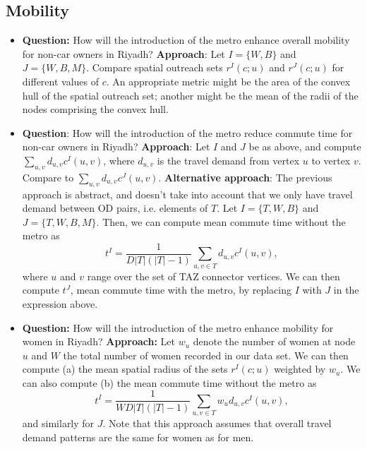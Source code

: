 \documentclass[english]{scrartcl}
\newcommand\abs[1]{\left|#1\right|}
\begin{document}
	\subsection{Mobility}
		\begin{itemize}
			\item \textbf{Question:} How will the introduction of the metro enhance overall mobility for non-car owners in Riyadh? \textbf{Approach}: Let $I = \{W, B\}$ and $J = \{W, B, M\}$. Compare spatial outreach sets $r^{I}(c;u)$ and $r^{J}(c;u)$ for different values of $c$. An appropriate metric might be the area of the convex hull of the spatial outreach set; another might be the mean of the radii of the nodes comprising the convex hull. 
			\item \textbf{Question}: How will the introduction of the metro reduce commute time for non-car owners in Riyadh? \textbf{Approach}: Let $I$ and $J$ be as above, and compute $\sum_{u,v} d_{u,v} c^{I}(u,v)$, where $d_{u,v}$ is the travel demand from vertex $u$ to vertex $v$. Compare to $\sum_{u,v} d_{u,v} c^{J}(u,v)$. \textbf{Alternative approach}: The previous approach is abstract, and doesn't take into account that we only have travel demand between OD pairs, i.e. elements of $T$. Let $I = \{ T, W, B \}$ and $J = \{T, W, B, M \}$. Then, we can compute mean commute time without the metro as 
			$$t^I = \frac{1}{D \abs{T}(\abs{T}-1)}\sum_{u,v \in T} d_{u,v} c^{I}(u,v),$$ 
			where $u$ and $v$ range over the set of TAZ connector vertices. We can then compute $t^J$, mean commute time with the metro, by replacing $I$ with $J$ in the expression above. 
			\item \textbf{Question:} How will the introduction of the metro enhance mobility for women in Riyadh? \textbf{Approach:} Let $w_u$ denote the number of women at node $u$ and $W$ the total number of women recorded in our data set. We can then compute (a) the mean spatial radius of the sets $r^I(c;u)$ weighted by $w_u$. We can also compute (b) the mean commute time without the metro as  
			$$t^I = \frac{1}{W D\abs{T}(\abs{T}-1)}\sum_{u,v \in T} w_u d_{u,v} c^{I}(u,v),$$ 
			and similarly for $J$. Note that this approach assumes that overall travel demand patterns are the same for women as for men. 
		\end{itemize}
\end{document}
